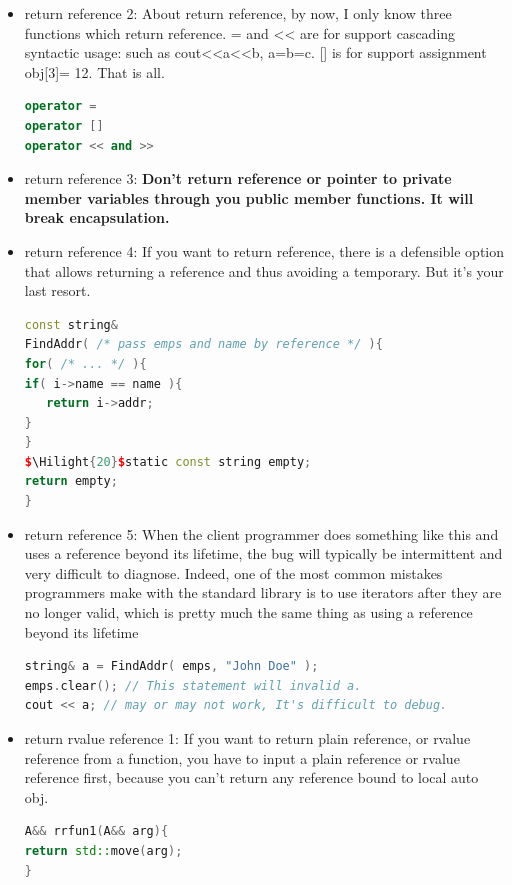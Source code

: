 \documentclass[a4paper,12pt,twoside]{book}
\newcommand{\Hilight}[1]{\makebox[0pt][l]{\color{yellow}\rule[-3pt]{#1em}{11pt}}}
\begin{document}
\begin{itemize}
\item return reference 2:  About return reference, by now, I only know three functions which return reference. = and << are for support cascading syntactic usage: such as cout<<a<<b, a=b=c.  [] is for support assignment obj[3]= 12.  That is all.
\begin{lstlisting}[frame=single, language=c++]
operator =
operator []
operator << and >>
\end{lstlisting}

\item return reference 3: \textbf{Don't return reference or pointer to private member variables through you public member functions. It will break encapsulation. }


\item return reference 4: If you want to return reference,  there is a defensible option that allows returning a reference and thus avoiding a temporary. But it's your last resort.
\begin{lstlisting}[frame=single, language=c++, mathescape=true]
const string&
FindAddr( /* pass emps and name by reference */ ){
for( /* ... */ ){
if( i->name == name ){
   return i->addr;
}
}
$\Hilight{20}$static const string empty;
return empty;
}
\end{lstlisting}

\item return reference 5:  When the client programmer does something like this and uses a reference beyond its lifetime, the bug will typically be intermittent and very difficult to diagnose. Indeed, one of the most common mistakes programmers make with the standard library is to use iterators after they are no longer valid, which is pretty much the same thing as using a reference beyond its lifetime
\begin{lstlisting}[frame=single, language=c++, mathescape=true]
string& a = FindAddr( emps, "John Doe" );
emps.clear(); // This statement will invalid a.
cout << a; // may or may not work, It's difficult to debug.
\end{lstlisting}

\item return rvalue reference 1:   If you want to return plain reference, or rvalue reference from a function, you have to input a plain reference or rvalue reference first, because you can't return any reference bound to local auto obj.
\begin{lstlisting}[frame=single, language=c++]
A&& rrfun1(A&& arg){
return std::move(arg);
}


\end{lstlisting}
\end{itemize}
\end{document}
